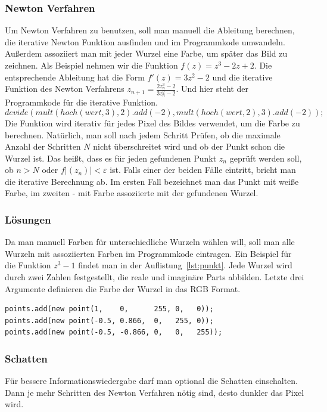\documentclass[a4paper,12pt]{llncs}
\numberwithin{equation}{section}
\begin{document}
\subsubsection{Newton Verfahren}
Um Newton Verfahren zu benutzen, soll man manuell die Ableitung berechnen, die iterative Newton Funktion ausfinden und im Programmkode umwandeln.
Außerdem assoziiert man mit jeder Wurzel eine Farbe, um später das Bild zu zeichnen.
Als Beispiel nehmen wir die Funktion $f(z) = z^3 - 2z + 2$.
Die entsprechende Ableitung hat die Form $f'(z) = 3z^2 - 2$ und die iterative Funktion des Newton Verfahrens $z_{n+1} = \frac{2z_n^3 - 2}{3z_n^2 - 2}$.
Und hier steht der Programmkode für die iterative Funktion.
\[
	devide(mult(hoch(wert,3),2).add(-2), mult(hoch(wert,2),3).add(-2));
\]
Die Funktion wird iterativ für jedes Pixel des Bildes verwendet, um die Farbe zu berechnen.
Natürlich, man soll nach jedem Schritt Prüfen, ob die maximale Anzahl der Schritten $N$ nicht überschreitet wird und ob der Punkt schon die Wurzel ist. 
Das heißt, dass es für jeden gefundenen Punkt $z_n$ geprüft werden soll, ob $n > N$ oder $f|(z_n)| < \varepsilon$ ist.
Falls einer der beiden Fälle eintritt, bricht man die iterative Berechnung ab.
Im ersten Fall bezeichnet man das Punkt mit weiße Farbe, im zweiten - mit Farbe assoziierte mit der gefundenen Wurzel. 

\subsubsection{Lösungen} 
Da man manuell Farben für unterschiedliche Wurzeln wählen will, soll man alle Wurzeln mit assoziierten Farben im Programmkode eintragen. 
Ein Beispiel für die Funktion $z^3 - 1$ findet man in der Auflistung~\ref{lst:punkt}. 
Jede Wurzel wird durch zwei Zahlen festgestellt, die reale und imaginäre Parts abbilden.
Letzte drei Argumente definieren die Farbe der Wurzel in das RGB Format.
\begin{lstlisting}[caption=Wurzeln mit Farben für $z^3 - 1$, label=lst:punkt]
points.add(new point(1,	   0,	   255, 0,   0));
points.add(new point(-0.5, 0.866,  0,   255, 0));
points.add(new point(-0.5, -0.866, 0,   0,   255));
\end{lstlisting}

\subsubsection{Schatten}
Für bessere Informationswiedergabe darf man optional die Schatten einschalten.
Dann je mehr Schritten des Newton Verfahren nötig sind, desto dunkler das Pixel wird.  
\end{document}
